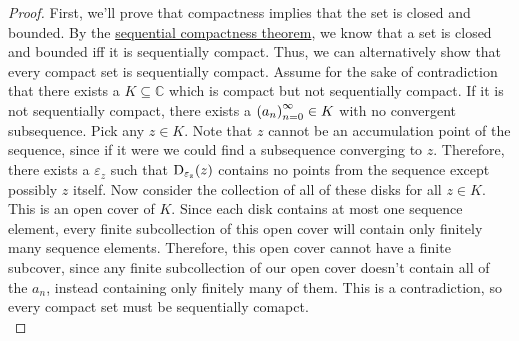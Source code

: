 \begin{proof}
First, we'll prove that compactness implies that the set is closed and bounded. By the \hyperlink{Sequential Compactness Theorem}{sequential compactness theorem}, we know that a set is closed and bounded iff it is sequentially compact. Thus, we can alternatively show that every compact set is sequentially compact. Assume for the sake of contradiction that there exists a $K \subseteq \mathbb{C}$ which is compact but not sequentially compact. If it is not sequentially compact, there exists a $\seq{a} \in K$ with no convergent subsequence. Pick any $z \in K$. Note that $z$ cannot be an accumulation point of the sequence, since if it were we could find a subsequence converging to $z$. Therefore, there exists a $\varepsilon_z$ such that $\disk{z}{\varepsilon_z}$ contains no points from the sequence except possibly $z$ itself. Now consider the collection of all of these disks for all $z \in K$. This is an open cover of $K$. Since each disk contains at most one sequence element, every finite subcollection of this open cover will contain only finitely many sequence elements. Therefore, this open cover cannot have a finite subcover, since any finite subcollection of our open cover doesn't contain all of the $a_n$, instead containing only finitely many of them. This is a contradiction, so every compact set must be sequentially comapct.\\

\end{proof}

